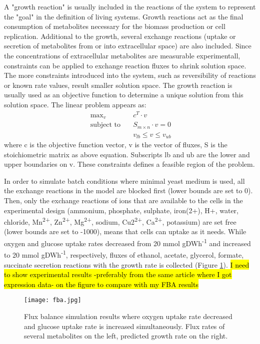 A "growth reaction" is usually included in the reactions of the system to represent the "goal" in the definition of living systems. Growth reactions act as the final consumption of metabolites necessary for the biomass production or cell replication. Additional to the growth, several exchange reactions (uptake or secretion of metabolites from or into extracellular space) are also included. Since the concentrations of extracellular metabolites are measurable experimentall, constraints can be applied to exchange reaction fluxes to shrink solution space. The more constraints introduced into the system, such as reversibility of reactions or known rate values, result smaller solution space. The growth reaction is usually used as an objective function to determine a unique solution from this solution space. The linear problem appears as:
\begin{align}
  \ \text{max}_v \quad & c^T \cdot v \\
  \label{eq:fba}
  \ \text{subject to} \quad & S_{m \times n} \cdot v=0 \\
  \ & v_{lb} \leq v \leq v_{ub}
\end{align}
\noindent where c is the objective function vector, v is the vector of fluxes, S is the stoichiometric matrix as above equation. Subscripts lb and ub are the lower and upper boundaries on v. These constraints defines a feasible region of the problem.

In order to simulate batch conditions where minimal yeast medium is used, all the exchange reactions in the model are blocked first (lower bounds are set to 0). Then, only the exchange reactions of ions that are available to the cells in the experimental design (ammonium, phosphate, sulphate, iron(2+), H+, water, chloride, Mn\textsuperscript{2+}, Zn\textsuperscript{2+}, Mg\textsuperscript{2+}, sodium, Cu2\textsuperscript{2+}, Ca\textsuperscript{2+}, potassium) are set free (lower bounds are set to -1000), means that cells can uptake as it needs. While oxygen and glucose uptake rates decreased from 20 mmol gDWh\textsuperscript{-1} and increased to 20 mmol gDWh\textsuperscript{-1}, respectively, fluxes of ethanol, acetate, glycerol, formate, succinate secretion reactions with the growth rate is collected (Figure \ref{fig:fba}).
\hl{I need to show experimental results -preferably from the same article where I got expression data- on the figure to compare with my FBA results}

\begin{figure}[H]
\begin{center}
\texttt{[image: fba.jpg]}
\end{center}
\caption[Flux balance simulation results]{Flux balance simulation results where oxygen uptake rate decreased and glucose uptake rate is increased simultaneously. Flux rates of several metabolites on the left, predicted growth rate on the right.}
\label{fig:fba}
\end{figure}

